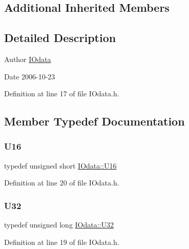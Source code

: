 \subsection*{Additional Inherited Members}


\subsection{Detailed Description}
\begin{DoxyAuthor}{Author}
\hyperlink{classIOdata}{I\+Odata} 
\end{DoxyAuthor}
\begin{DoxyDate}{Date}
2006-\/10-\/23 
\end{DoxyDate}


Definition at line 17 of file I\+Odata.\+h.



\subsection{Member Typedef Documentation}
\mbox{\label{classIOdata_a1eb45b348534a7c19a4a99b746e693ff}} 
\subsubsection{\texorpdfstring{U16}{U16}}
{\footnotesize\ttfamily typedef unsigned short \hyperlink{classIOdata_a1eb45b348534a7c19a4a99b746e693ff}{I\+Odata\+::\+U16}}



Definition at line 20 of file I\+Odata.\+h.

\mbox{\label{classIOdata_a96fb57f5fcd87b708743abd3c86a5198}} 
\subsubsection{\texorpdfstring{U32}{U32}}
{\footnotesize\ttfamily typedef unsigned long \hyperlink{classIOdata_a96fb57f5fcd87b708743abd3c86a5198}{I\+Odata\+::\+U32}}



Definition at line 19 of file I\+Odata.\+h.

\mbox{\label{classIOdata_a18d1354b7cdaf0f8a8001fdbb3ced418}} 
